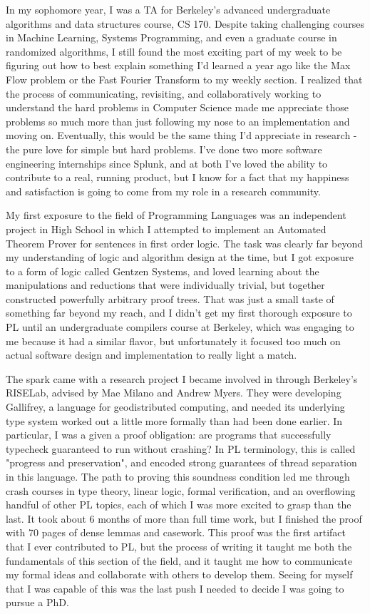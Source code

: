 \documentclass{nsf-grfp}
\begin{document}
In my sophomore year, I was a TA for Berkeley's advanced undergraduate algorithms and data structures course, CS 170. Despite taking challenging courses in Machine Learning, Systems Programming, and even a graduate course in randomized algorithms, I still found the most exciting part of my week to be figuring out how to best explain something I'd learned a year ago like the Max Flow problem or the Fast Fourier Transform to my weekly section. I realized that the process of communicating, revisiting, and collaboratively working to understand the hard problems in Computer Science made me appreciate those problems so much more than just following my nose to an implementation and moving on. Eventually, this would be the same thing I'd appreciate in research - the pure love for simple but hard problems. I've done two more software engineering internships since Splunk, and at both I've loved the ability to contribute to a real, running product, but I know for a fact that my happiness and satisfaction is going to come from my role in a research community.

My first exposure to the field of Programming Languages was an independent project in High School in which I attempted to implement an Automated Theorem Prover for sentences in first order logic. The task was clearly far beyond my understanding of logic and algorithm design at the time, but I got exposure to a form of logic called Gentzen Systems, and loved learning about the manipulations and reductions that were individually trivial, but together constructed powerfully arbitrary proof trees. That was just a small taste of something far beyond my reach, and I didn't get my first thorough exposure to PL until an undergraduate compilers course at Berkeley, which was engaging to me because it had a similar flavor, but unfortunately it focused too much on actual software design and implementation to really light a match. 

The spark came with a research project I became involved in through Berkeley's RISELab, advised by Mae Milano and Andrew Myers. They were developing Gallifrey, a language for geodistributed computing, and needed its underlying type system worked out a little more formally than had been done earlier. In particular, I was a given a proof obligation: are programs that successfully typecheck guaranteed to run without crashing? In PL terminology, this is called "progress and preservation", and encoded strong guarantees of thread separation in this language. The path to proving this soundness condition led me through crash courses in type theory, linear logic, formal verification, and an overflowing handful of other PL topics, each of which I was more excited to grasp than the last. It took about 6 months of more than full time work, but I finished the proof with 70 pages of dense lemmas and casework. This proof was the first artifact that I ever contributed to PL, but the process of writing it taught me both the fundamentals of this section of the field, and it taught me how to communicate my formal ideas and collaborate with others to develop them. Seeing for myself that I was capable of this was the last push I needed to decide I was going to pursue a PhD.
\end{document}
